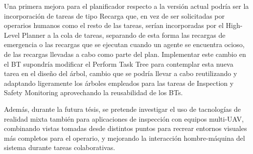 \documentclass[fontsize=11pt, English=false, Español=true, Myfinal=true, twoside, numbers=noenddot]{scrbook}
\begin{document}
{Una primera mejora para el planificador respecto a la versión actual podría ser la incorporación de tareas de tipo Recarga que, en vez de ser solicitadas por operarios humanos como el resto de las tareas, serían incorporadas por el High-Level Planner a la cola de tareas, separando de esta forma las recargas de emergencia o las recargas que se ejecutan cuando un agente se encuentra ocioso, de las recargas llevadas a cabo como parte del plan. Implementar este cambio en el BT supondría modificar el Perform Task Tree para contemplar esta nueva tarea en el diseño del árbol, cambio que se podría llevar a cabo reutilizando y adaptando ligeramente los árboles empleados para las tareas de Inspection y Safety Monitoring aprovechando la reusabilidad de los BTs.

Además, durante la futura tésis, se pretende investigar el uso de tacnologías de realidad mixta también para aplicaciones de inspección con equipos multi-UAV, combinando vistas tomadas desde distintos puntos para recrear entornos visuales más completos para el operario, y mejorando la interacción hombre-máquina del sistema durante tareas colaborativas.


%
%

%
%
%  
%

\backmatter

\cleardoublepage
{}

}
\end{document}
